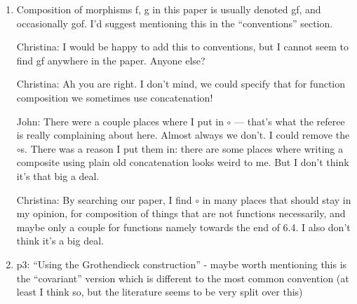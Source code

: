 \documentclass[reqno]{amsart}
\def\chris{\color{purple} Christina: }
\def\john{\color{red} John: }
\begin{document}
\begin{enumerate}
{\bf We believe that it is hard to analyze the examples (even the motivating one of open graphs) without having laid all relevant theory. Also, 
the comparison between the two descriptions -- prominent in Section 6.1 -- would then not be possible to illustrate. In order to 
better direct the reader to the applications, we added one sentence at each introductory paragraph of Sections 2 and 3 that point to Section 6 for 
concrete examples.}

{\john
I don't want to bust up the examples and put some in sections 2 and 3. Anyone who wants examples can easily find them all in Section 6, we mention 
this section in the introduction (and perhaps should advertise it more there), and it's hard to analyze the examples without having all the theory in 
hand.}

{\chris I agree. How does the above boldface sound?}


{\chris Fourth review starts here}
\item Composition of morphisms f, g in this paper is usually denoted gf, and occasionally gof. I’d suggest mentioning this in the “conventions” 
section.

{\chris I would be happy to add this to conventions, but I cannot seem to find gf anywhere in the paper. Anyone else?}

{\color{blue}{Kenny: They might not mean $gf$ specifically, but there are many instances where we don't use a $\circ$ for functional composition, e.g. 
when we're pushing forward a graph structure over a map $f$ of vertices towards the top of page 21. Do we want to use a $\circ$ or not?}}

{\chris Ah you are right. I don't mind, we could specify that for function composition we sometimes use concatenation!}

{\john There were a couple places where I put in $\circ$ --- that's what the referee is really complaining
about here.  Almost always we don't.  I could remove the $\circ$s.  There was a reason I put them in: there are some places where writing a composite 
using plain old concatenation looks weird to me.   But I don't think it's that big a deal.}

{\chris By searching our paper, I find $\circ$ in many places that should stay in my opinion, for composition of things that are not functions 
necessarily, and maybe only a couple for functions namely towards the end of 6.4. I also don't think it's a big deal.}


\item p3: “Using the Grothendieck construction” - maybe worth mentioning this is the “covariant” version which is different to the most common 
convention 
(at least I think so, but the literature seems to be very split over this)


\end{enumerate}
\end{document}
